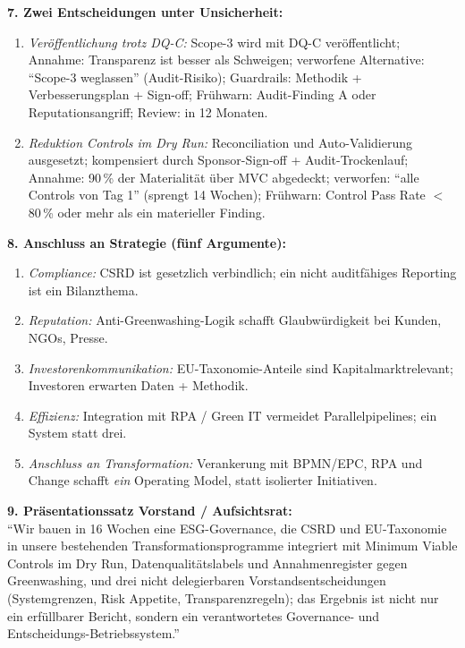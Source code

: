 \documentclass[11pt,a4paper,oneside]{article}
\begin{document}
\begin{loesungbox}
\smallskip
\textbf{7. Zwei Entscheidungen unter Unsicherheit:}
\begin{enumerate}
  \item \emph{Ver\"offentlichung trotz DQ-C:} Scope-3 wird mit DQ-C ver\"offentlicht; Annahme: Transparenz ist besser als Schweigen; verworfene Alternative: ``Scope-3 weglassen'' (Audit-Risiko); Guardrails: Methodik + Verbesserungsplan + Sign-off; Fr\"uhwarn: Audit-Finding A oder Reputationsangriff; Review: in 12 Monaten.
  \item \emph{Reduktion Controls im Dry Run:} Reconciliation und Auto-Validierung ausgesetzt; kompensiert durch Sponsor-Sign-off + Audit-Trockenlauf; Annahme: 90\,\% der Materialit\"at \"uber MVC abgedeckt; verworfen: ``alle Controls von Tag 1'' (sprengt 14 Wochen); Fr\"uhwarn: Control Pass Rate $<$\,80\,\% oder mehr als ein materieller Finding.
\end{enumerate}

\smallskip
\textbf{8. Anschluss an Strategie (f\"unf Argumente):}
\begin{enumerate}
  \item \emph{Compliance:} CSRD ist gesetzlich verbindlich; ein nicht auditf\"ahiges Reporting ist ein Bilanzthema.
  \item \emph{Reputation:} Anti-Greenwashing-Logik schafft Glaubw\"urdigkeit bei Kunden, NGOs, Presse.
  \item \emph{Investorenkommunikation:} EU-Taxonomie-Anteile sind Kapitalmarktrelevant; Investoren erwarten Daten + Methodik.
  \item \emph{Effizienz:} Integration mit RPA / Green IT vermeidet Parallelpipelines; ein System statt drei.
  \item \emph{Anschluss an Transformation:} Verankerung mit BPMN/EPC, RPA und Change schafft \emph{ein} Operating Model, statt isolierter Initiativen.
\end{enumerate}

\smallskip
\textbf{9. Pr\"asentationssatz Vorstand / Aufsichtsrat:}\\
``Wir bauen in 16 Wochen eine ESG-Governance, die CSRD und EU-Taxonomie in unsere bestehenden Transformationsprogramme integriert \textendash{} mit Minimum Viable Controls im Dry Run, Datenqualit\"atslabels und Annahmenregister gegen Greenwashing, und drei nicht delegierbaren Vorstandsentscheidungen (Systemgrenzen, Risk Appetite, Transparenzregeln); das Ergebnis ist nicht nur ein erf\"ullbarer Bericht, sondern ein verantwortetes Governance- und Entscheidungs-Betriebssystem.''
\end{loesungbox}
\end{document}
